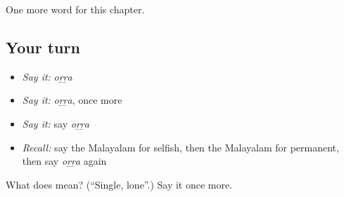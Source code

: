 \begin{grammarlens}[title={What you've built}]
One more word for this chapter.
\end{grammarlens}

\subsection*{Your turn}
\begin{itemize}
\raggedright
  \item \emph{Say it:} \emph{oṟṟa}
  \item \emph{Say it:} \emph{oṟṟa}, once more
  \item \emph{Say it:} say \emph{oṟṟa}
  \item \emph{Recall:} say the Malayalam for selfish, then the Malayalam for permanent, then say \emph{oṟṟa} again
\end{itemize}

\begin{tcolorbox}[breakable,colback=teal!4,colframe=teal!35!black,title={Before you move on}]
What does  mean? (\textquotedblleft{}Single, lone\textquotedblright{}.) Say it once more.
\end{tcolorbox}
